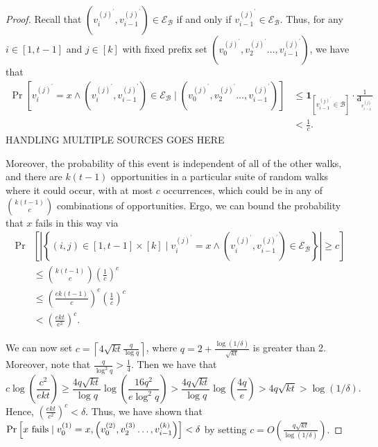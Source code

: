 \documentclass{report}
\begin{document}
\begin{proof}
Recall that $\left ( v_i^{(j)^\prime}, v_{i-1}^{(j)^\prime} \right ) \in \mathcal{E}_\mathcal{B}$ if and only if $v_{i-1}^{(j)^\prime} \in \mathcal{E}_\mathcal{B}$.
Thus, for any $i \in [1, t-1]$ and $j \in [k]$ with fixed prefix set 
$\left (v_0^{(j)^\prime}, v_2^{(j)^\prime} \dots, v_{i-1}^{(j)^\prime} \right )$,
we have that 
%
\begin{align*}
\Pr \left [ 
		v_i^{(j)^\prime} = x \wedge 
		\left ( v_i^{(j)^\prime}, v_{i-1}^{(j)^\prime} \right ) \in \mathcal{E}_\mathcal{B} 
				\mid \left (v_0^{(j)^\prime}, v_2^{(j)^\prime} \dots, v_{i-1}^{(j)^\prime} \right )
\right ]
&\leq
\mathbf{1}_{\left [ v_{i-1}^{(j)^\prime} \in \mathcal{B} \right ]} \cdot \frac{1}{\mathbf{d}_{v_{i-1}^{(j)^\prime}}}
\\
&<
\frac{1}{c}.
\end{align*}
%
{\color{red} HANDLING MULTIPLE SOURCES GOES HERE}

Moreover, the probability of this event is independent of all of the other walks, and there are $k(t-1)$ opportunities in a particular suite of random walks where it could occur, with at most $c$ occurrences, which could be in any of ${k(t-1) \choose c}$ combinations of opportunities. 
Ergo, we can bound the probability that $x$ fails in this way via 
\begin{align*}
\Pr &\left [
	\left | \left \{ 
		(i,j) \in [1, t-1] \times [k] 
			\mid v_{i}^{(j)^\prime} = x 
			\wedge \left ( v_{i}^{(j)^\prime}, v_{i - 1}^{(j)^\prime} \right ) \in \mathcal{E}_\mathcal{B}
	\right \} \right | \geq c
\right ]	
\\
&\leq 
{k(t -1) \choose c} \left ( \frac{1}{c} \right )^c
\\
&\leq 
\left ( \frac{ek(t-1)}{c} \right )^c \left ( \frac{1}{c} \right )^c
\\
&< 
\left ( \frac{ekt}{c^2} \right )^c.
\end{align*}
%

We can now set $c = \left \lceil 4 \sqrt{kt} \frac{q}{\log q} \right \rceil$, where $q = 2 + \frac{\log (1/\delta)}{\sqrt{kt}}$ is greater than 2. 
Moreover, note that $\frac{q}{\log^2 q} > \frac{1}{4}$.
Then we have that 
%
\begin{equation*}
c \log \left ( \frac{c^2}{ekt} \right ) 
\geq 
\frac{4 q \sqrt{kt}}{\log q} \log \left ( \frac{16q^2}{e \log^2q} \right )
>
\frac{4 q \sqrt{kt}}{\log q} \log \left ( \frac{4q}{e} \right )
> 
4 q\sqrt{kt}
> \log (1/\delta).
\end{equation*}
%
Hence, $\left ( \frac{ekt}{c^2} \right )^c < \delta$.
Thus, we have shown that $\Pr \left [ \textnormal{$x$ fails} \mid v_0^{(1)}  = x , \left (v_0^{(2)}, v_2^{(3)} \dots, v_{i-1}^{(k)} \right ) \right ] < \delta$ by setting $c = O \left ( \frac{q \sqrt{kt}}{\log (1/\delta)} \right )$.

\end{proof}
\end{document}
